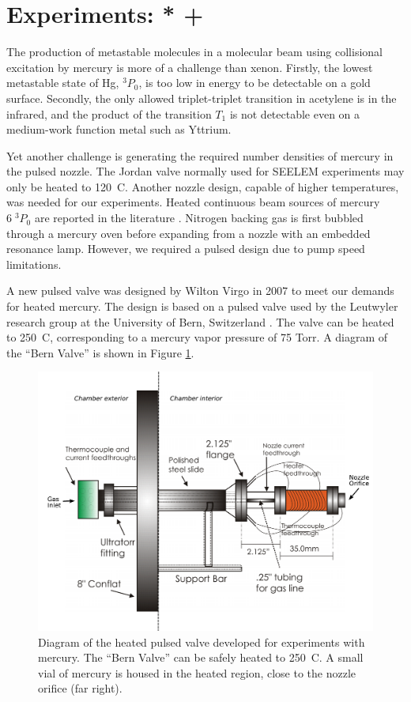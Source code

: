 \documentclass[12pt]{mitthesis}
\begin{document}
\section{Experiments: * + }

The production of metastable molecules in a molecular beam using
collisional excitation by mercury is more of a challenge than xenon.
Firstly, the lowest metastable state of Hg, $^3P_0$, is too low in
energy to be detectable on a gold surface.  Secondly, the only allowed
triplet-triplet transition in acetylene is in the infrared, and the
product of the transition $T_1$ is not detectable even on a
medium-work function metal such as Yttrium.

Yet another challenge is generating the required number densities of
mercury in the pulsed nozzle.  The Jordan valve normally used for
SEELEM experiments may only be heated to 120\degrees\ C.  Another
nozzle design, capable of higher temperatures, was needed for our
experiments.  Heated continuous beam sources of mercury $6 \; ^3P_0$
are reported in the literature \cite{haberman75, obi83}.  Nitrogen
backing gas is first bubbled through a mercury oven before expanding
from a nozzle with an embedded resonance lamp.  However, we required a
pulsed design due to pump speed limitations.  

A new pulsed valve was designed by Wilton Virgo in 2007 to meet our
demands for heated mercury.  The design is based on a pulsed valve
used by the Leutwyler research group at the University of Bern,
Switzerland \cite{tanner06, mueller99}.  The valve can be heated to
250\degrees\ C, corresponding to a mercury vapor pressure of 75 Torr.
A diagram of the ``Bern Valve'' is shown in Figure
\ref{fig:bern-diagram}.

\begin{figure}
  \caption{Diagram of the heated pulsed valve developed for
    experiments with mercury.  The ``Bern Valve'' can be safely heated
    to 250\degrees\ C.  A small vial of mercury is housed in the
    heated region, close to the nozzle orifice (far right).}
  \label{fig:bern-diagram}
  \centering
  \vspace{1cm}
  \includegraphics[width=6.3in, trim=1cm 0 0 0]{bern-diagram.pdf}
  \vspace{1in}
\end{figure}
\end{document}
